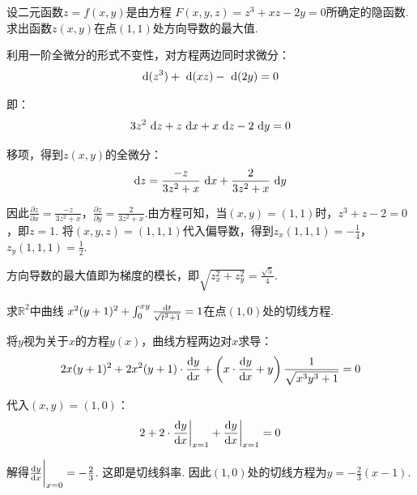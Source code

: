 \begin{example}[2022 B卷]
\label{ex:ch06-18}
设二元函数$z = f(x,y)$是由方程
$F(x,y,z) = z^3 + xz -2y =0$所确定的隐函数.
求出函数$z(x,y)$在点$(1,1)$处方向导数的最大值.
\end{example}

\begin{solution}
利用一阶全微分的形式不变性，对方程两边同时求微分：
\begin{equation}
    \begin{aligned}
        \mathrm{d} (z^3) + ~\mathrm{d} (xz) - ~\mathrm{d} (2y) = 0
        \nonumber
    \end{aligned}
\end{equation}\par
即：
\begin{equation}
    \begin{aligned}
        3z^2 ~\mathrm{d} z + z~\mathrm{d} x + x ~\mathrm{d} z - 2 ~\mathrm{d} y = 0
        \nonumber
    \end{aligned}
\end{equation}\par
移项，得到$z(x,y)$的全微分：
\begin{equation}
    \begin{aligned}
        \mathrm{d} z = \frac{-z}{3z^2 + x} ~\mathrm{d} x + \frac{2}{3z^2 + x} ~\mathrm{d} y
        \nonumber
    \end{aligned}
\end{equation}\par
因此$\frac{\partial z}{\partial x} = \frac{-z}{3z^2 + x}$，$\frac{\partial z}{\partial y} = \frac{2}{3z^2 + x}$.由方程可知，当$(x,y) = (1,1)$时，$z^3 + z -2 = 0$，即$z=1$.
将$(x,y,z) = (1,1,1)$代入偏导数，得到$z_x(1,1,1) = -\frac{1}{4}$，
$z_y(1,1,1) = \frac{1}{2}$.\par

方向导数的最大值即为梯度的模长，即$\sqrt{z_x^2 + z_y^2} = \frac{\sqrt{5}}{4}$.
\end{solution}

\begin{example}[2022 B卷]
\label{ex:ch06-19}
求$\mathbb{R}^2$中曲线
$x^2(y+1)^2 + \int_{0}^{xy} \frac{\mathrm{d} t}{\sqrt{t^3 + 1}} = 1$在点$(1,0)$处的切线方程.
\end{example}

\begin{solution}
将$y$视为关于$x$的方程$y(x)$，曲线方程两边对$x$求导：
\begin{equation}
    2x(y+1)^2 + 2x^2(y+1)\cdot \frac{\mathrm{d} y}{\mathrm{d} x}
    + \left(x \cdot \frac{\mathrm{d} y}{\mathrm{d} x} + y \right) \frac{1}{\sqrt{x^3y^3 + 1}} = 0
    \nonumber
\end{equation}

代入$(x,y)=(1,0)$：
\begin{equation}
    2 + 2 \cdot \frac{\mathrm{d} y}{\mathrm{d} x} \bigg|_{x=1} + \frac{\mathrm{d} y}{\mathrm{d} x} \bigg|_{x=1} = 0
    \nonumber
\end{equation}

解得$\frac{\mathrm{d} y}{\mathrm{d} x} \bigg|_{x=0} = -\frac{2}{3}$. 这即是切线斜率.
因此$(1,0)$处的切线方程为$y = -\frac{2}{3} (x-1)$.
\end{solution}

